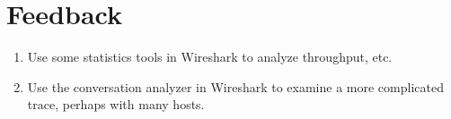 \section{Feedback}\label{sec:feedback}
\begin{enumerate}
	\item Use some statistics tools in Wireshark to analyze throughput, etc.
	\item Use the conversation analyzer in Wireshark to examine a more complicated trace, perhaps with many hosts.
\end{enumerate}
